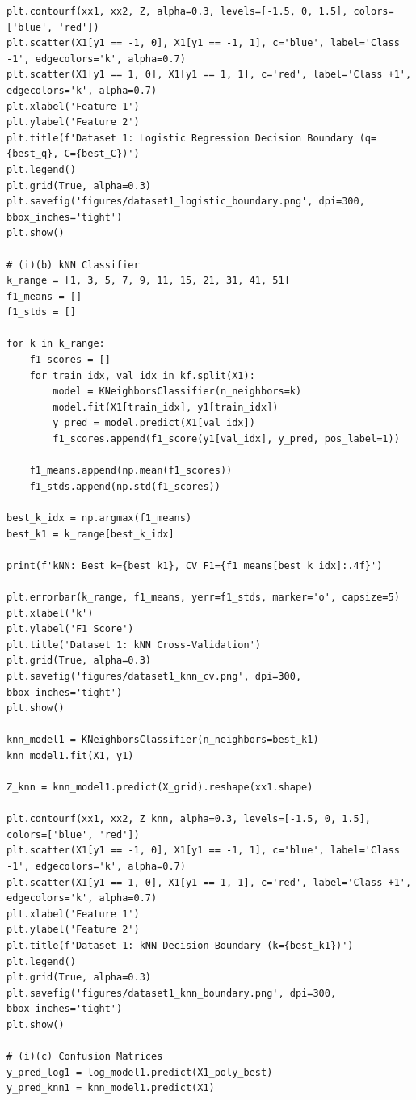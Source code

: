 \documentclass[11pt,a4paper]{article}
\begin{document}
\begin{lstlisting}
plt.contourf(xx1, xx2, Z, alpha=0.3, levels=[-1.5, 0, 1.5], colors=['blue', 'red'])
plt.scatter(X1[y1 == -1, 0], X1[y1 == -1, 1], c='blue', label='Class -1', edgecolors='k', alpha=0.7)
plt.scatter(X1[y1 == 1, 0], X1[y1 == 1, 1], c='red', label='Class +1', edgecolors='k', alpha=0.7)
plt.xlabel('Feature 1')
plt.ylabel('Feature 2')
plt.title(f'Dataset 1: Logistic Regression Decision Boundary (q={best_q}, C={best_C})')
plt.legend()
plt.grid(True, alpha=0.3)
plt.savefig('figures/dataset1_logistic_boundary.png', dpi=300, bbox_inches='tight')
plt.show()

# (i)(b) kNN Classifier
k_range = [1, 3, 5, 7, 9, 11, 15, 21, 31, 41, 51]
f1_means = []
f1_stds = []

for k in k_range:
    f1_scores = []
    for train_idx, val_idx in kf.split(X1):
        model = KNeighborsClassifier(n_neighbors=k)
        model.fit(X1[train_idx], y1[train_idx])
        y_pred = model.predict(X1[val_idx])
        f1_scores.append(f1_score(y1[val_idx], y_pred, pos_label=1))
    
    f1_means.append(np.mean(f1_scores))
    f1_stds.append(np.std(f1_scores))

best_k_idx = np.argmax(f1_means)
best_k1 = k_range[best_k_idx]

print(f'kNN: Best k={best_k1}, CV F1={f1_means[best_k_idx]:.4f}')

plt.errorbar(k_range, f1_means, yerr=f1_stds, marker='o', capsize=5)
plt.xlabel('k')
plt.ylabel('F1 Score')
plt.title('Dataset 1: kNN Cross-Validation')
plt.grid(True, alpha=0.3)
plt.savefig('figures/dataset1_knn_cv.png', dpi=300, bbox_inches='tight')
plt.show()

knn_model1 = KNeighborsClassifier(n_neighbors=best_k1)
knn_model1.fit(X1, y1)

Z_knn = knn_model1.predict(X_grid).reshape(xx1.shape)

plt.contourf(xx1, xx2, Z_knn, alpha=0.3, levels=[-1.5, 0, 1.5], colors=['blue', 'red'])
plt.scatter(X1[y1 == -1, 0], X1[y1 == -1, 1], c='blue', label='Class -1', edgecolors='k', alpha=0.7)
plt.scatter(X1[y1 == 1, 0], X1[y1 == 1, 1], c='red', label='Class +1', edgecolors='k', alpha=0.7)
plt.xlabel('Feature 1')
plt.ylabel('Feature 2')
plt.title(f'Dataset 1: kNN Decision Boundary (k={best_k1})')
plt.legend()
plt.grid(True, alpha=0.3)
plt.savefig('figures/dataset1_knn_boundary.png', dpi=300, bbox_inches='tight')
plt.show()

# (i)(c) Confusion Matrices
y_pred_log1 = log_model1.predict(X1_poly_best)
y_pred_knn1 = knn_model1.predict(X1)


\end{lstlisting}
\end{document}
